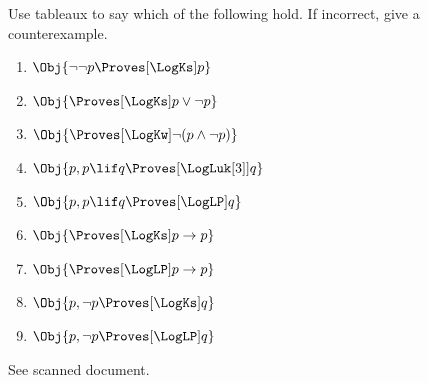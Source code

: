 \documentclass[../../../../include/open-logic-section]{subfiles}
\begin{document}


\begin{prob}[Tableaus]
Use tableaux to say which of the following hold. If incorrect, give a counterexample.
\begin{enumerate}
    \item $\Obj{\lnot\lnot p \Proves[\LogKs] p}$
	\item $\Obj{\Proves[\LogKs] p \lor\lnot p}$
	\item $\Obj{\Proves[\LogKw] \lnot(p \land\lnot p)}$
    \item $\Obj{p, p \lif q \Proves[\LogLuk[3]] q}$
    \item $\Obj{p, p \lif q \Proves[\LogLP] q}$
    \item $\Obj{\Proves[\LogKs] p \rightarrow p}$
    \item $\Obj{\Proves[\LogLP] p \rightarrow p}$
    \item $\Obj{p, \lnot p \Proves[\LogKs] q}$
    \item $\Obj{p, \lnot p \Proves[\LogLP] q}$
\end{enumerate}
\begin{ans}
See scanned document.
\end{ans}
\end{prob}
\end{document}
